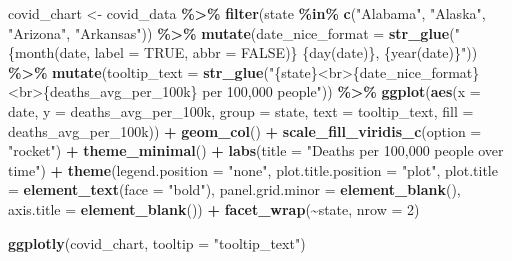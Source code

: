 \documentclass[
]{book}
\newenvironment{Shaded}{\begin{snugshade}}{\end{snugshade}}
\newcommand{\AttributeTok}[1]{\textcolor[rgb]{0.13,0.29,0.53}{#1}}
\newcommand{\DecValTok}[1]{\textcolor[rgb]{0.00,0.00,0.81}{#1}}
\newcommand{\FunctionTok}[1]{\textcolor[rgb]{0.13,0.29,0.53}{\textbf{#1}}}
\newcommand{\NormalTok}[1]{#1}
\newcommand{\OtherTok}[1]{\textcolor[rgb]{0.56,0.35,0.01}{#1}}
\newcommand{\SpecialCharTok}[1]{\textcolor[rgb]{0.81,0.36,0.00}{\textbf{#1}}}
\newcommand{\StringTok}[1]{\textcolor[rgb]{0.31,0.60,0.02}{#1}}
\begin{document}
\begin{Shaded}
\begin{Highlighting}[]
\NormalTok{covid\_chart }\OtherTok{\textless{}{-}}\NormalTok{ covid\_data }\SpecialCharTok{\%\textgreater{}\%} 
  \FunctionTok{filter}\NormalTok{(state }\SpecialCharTok{\%in\%} \FunctionTok{c}\NormalTok{(}\StringTok{"Alabama"}\NormalTok{,}
                      \StringTok{"Alaska"}\NormalTok{,}
                      \StringTok{"Arizona"}\NormalTok{,}
                      \StringTok{"Arkansas"}\NormalTok{)) }\SpecialCharTok{\%\textgreater{}\%} 
    \FunctionTok{mutate}\NormalTok{(}\AttributeTok{date\_nice\_format =} \FunctionTok{str\_glue}\NormalTok{(}\StringTok{"\{month(date, label = TRUE, abbr = FALSE)\} \{day(date)\}, \{year(date)\}"}\NormalTok{)) }\SpecialCharTok{\%\textgreater{}\%} 
  \FunctionTok{mutate}\NormalTok{(}\AttributeTok{tooltip\_text =} \FunctionTok{str\_glue}\NormalTok{(}\StringTok{"\{state\}\textless{}br\textgreater{}\{date\_nice\_format\}\textless{}br\textgreater{}\{deaths\_avg\_per\_100k\} per 100,000 people"}\NormalTok{)) }\SpecialCharTok{\%\textgreater{}\%} 
  \FunctionTok{ggplot}\NormalTok{(}\FunctionTok{aes}\NormalTok{(}\AttributeTok{x =}\NormalTok{ date,}
             \AttributeTok{y =}\NormalTok{ deaths\_avg\_per\_100k,}
             \AttributeTok{group =}\NormalTok{ state,}
             \AttributeTok{text =}\NormalTok{ tooltip\_text,}
             \AttributeTok{fill =}\NormalTok{ deaths\_avg\_per\_100k)) }\SpecialCharTok{+}
  \FunctionTok{geom\_col}\NormalTok{() }\SpecialCharTok{+}
  \FunctionTok{scale\_fill\_viridis\_c}\NormalTok{(}\AttributeTok{option =} \StringTok{"rocket"}\NormalTok{) }\SpecialCharTok{+}
  \FunctionTok{theme\_minimal}\NormalTok{() }\SpecialCharTok{+}
  \FunctionTok{labs}\NormalTok{(}\AttributeTok{title =} \StringTok{"Deaths per 100,000 people over time"}\NormalTok{) }\SpecialCharTok{+}
  \FunctionTok{theme}\NormalTok{(}\AttributeTok{legend.position =} \StringTok{"none"}\NormalTok{,}
        \AttributeTok{plot.title.position =} \StringTok{"plot"}\NormalTok{,}
        \AttributeTok{plot.title =} \FunctionTok{element\_text}\NormalTok{(}\AttributeTok{face =} \StringTok{"bold"}\NormalTok{),}
        \AttributeTok{panel.grid.minor =} \FunctionTok{element\_blank}\NormalTok{(),}
        \AttributeTok{axis.title =} \FunctionTok{element\_blank}\NormalTok{()) }\SpecialCharTok{+}
  \FunctionTok{facet\_wrap}\NormalTok{(}\SpecialCharTok{\textasciitilde{}}\NormalTok{state,}
             \AttributeTok{nrow =} \DecValTok{2}\NormalTok{)}


\FunctionTok{ggplotly}\NormalTok{(covid\_chart,}
         \AttributeTok{tooltip =} \StringTok{"tooltip\_text"}\NormalTok{)}
\end{Highlighting}
\end{Shaded}
\end{document}
